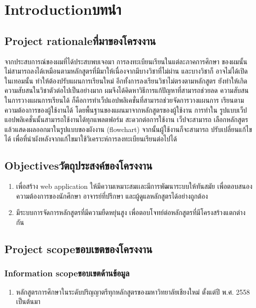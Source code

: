 \chapter{\ifenglish Introduction\else บทนำ\fi}

\section{\ifenglish Project rationale\else ที่มาของโครงงาน\fi}

จากประสบการณ์ของผมที่ได้ประสบพบเจอมา การลงทะเบียนเรียนในแต่ละภาคการศึกษา
ของผมนั้นไม่สามารถลงได้เหมือนตามหลักสูตรที่มีมาให้เนื่องจากมีบางวิชาที่ไม่ผ่าน และบางวิชาก็
อาจไม่ได้เปิดในเทอมนั้น ทำให้ต้องปรับแผนการเรียนใหม่ อีกทั้งการลงเรียนวิชาไม่ตรงตามหลักสูตร
ยังทำให้เกิดความสับสนในวิชาตัวต่อไปเป็นอย่างมาก ผมจึงได้คิดหาวิธีการแก้ปัญหาที่สามารถช่วยลด
ความสับสนในการวางแผนการเรียนได้ ก็คือการทำเว็ปแอปพลิเคชั่นที่สามารถช่วยจัดการวางแผนการ
เรียนตามความต้องการของผู้ใช้งานได้ โดยพื้นฐานของแผนมาจากหลักสูตรของผู้ใช้งาน การทำใน
รูปแบบเว็ปแอปพลิเคชั่นนั้นสามารถใช้งานได้ทุกแพลตฟอร์ม สะดวกต่อการใช้งาน เว็ปจะสามารถ
เลือกหลักสูตรแล้วแสดงผลออกมาในรูปแบบของผังงาน (flowchart) จากนั้นผู้ใช้งานก็จะสามารถ
ปรับเปลี่ยนแก้ไขได้ เพื่อที่นำผังหลังจากแก้ไขมาใช้วิเคราะห์การลงทะเบียนเรียนต่อไปได้

\section{\ifenglish Objectives\else วัตถุประสงค์ของโครงงาน\fi}
\begin{enumerate}
    \item เพื่อสร้าง web application ให้มีความเหมาะสมเเละมีการพัฒนาระบบให้ทันสมัย เพื่อตอบสนองความต้องการของนักศึกษา อาจารย์ที่ปรึกษา และผู้ดูแลหลักสูตรได้อย่างถูกต้อง
    \item มีระบบการจัดการหลักสูตรที่มีความยืดหยุ่นสูง เพื่อตอบโจทย์ต่อหลักสูตรที่มีโครงสร้างแตกต่างกัน
\end{enumerate}

\section{\ifenglish Project scope\else ขอบเขตของโครงงาน\fi}

\subsection{\ifenglish Information scope\else ขอบเขตด้านข้อมูล\fi}
\begin{enumerate}
    \item หลักสูตรการศึกษาในระดับปริญญาตรีทุกหลักสูตรของมหาวิทยาลัยเชียงใหม่ ตั้งแต่ปี พ.ศ. 2558 เป็นต้นมา 
\end{enumerate}

